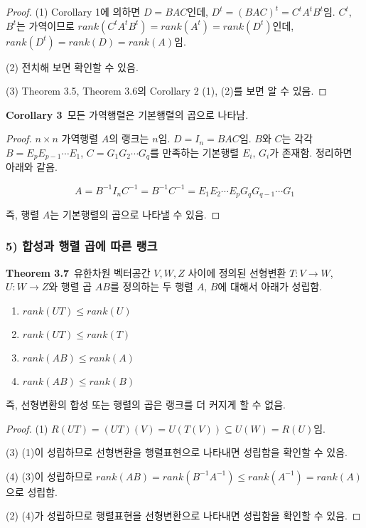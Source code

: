\begin{proof}
(1) Corollary 1에 의하면 $D=BAC$인데, $D^t=(BAC)^t=C^{t}A^{t}B^{t}$임. $C^{t}$, $B^{t}$는 가역이므로 $rank(C^{t}A^{t}B^{t})=rank(A^{t})=rank(D^t)$인데, $rank(D^t)=rank(D)=rank(A)$임.

(2) 전치해 보면 확인할 수 있음.

(3) Theorem 3.5, Theorem 3.6의 Corollary 2 (1), (2)를 보면 알 수 있음.
\end{proof}

\textbf{Corollary 3}\, 모든 가역행렬은 기본행렬의 곱으로 나타남.

\begin{proof}
$n \times n$ 가역행렬 $A$의 랭크는 $n$임. $D=I_n=BAC$임. $B$와 $C$는 각각 $B=E_{p}E_{p-1} \cdots E_{1}$, $C=G_{1}G_{2} \cdots G_{q}$를 만족하는 기본행렬 $E_{i},\,G_{i}$가 존재함. 정리하면 아래와 같음.

\[
A=B^{-1}I_{n}C^{-1}=B^{-1}C^{-1}=E_{1}E_{2} \cdots E_{p}G_{q}G_{q-1} \cdots G_{1}
\]

즉, 행렬 $A$는 기본행렬의 곱으로 나타낼 수 있음.
\end{proof}

\subsubsection*{5) 합성과 행렬 곱에 따른 랭크}
\textbf{Theorem 3.7}\, 유한차원 벡터공간 $V,W,Z$ 사이에 정의된 선형변환 $T:V \rightarrow W$, $U:W \rightarrow Z$와 행렬 곱 $AB$를 정의하는 두 행렬 $A,\,B$에 대해서 아래가 성립함.

\begin{enumerate}
    \item $rank(UT) \leq rank(U)$
    \item $rank(UT) \leq rank(T)$
    \item $rank(AB) \leq rank(A)$
    \item $rank(AB) \leq rank(B)$
\end{enumerate}

즉, 선형변환의 합성 또는 행렬의 곱은 랭크를 더 커지게 할 수 없음.

\begin{proof}
(1) $R(UT)=(UT)(V)=U(T(V)) \subseteq U(W)=R(U)$임.

(3) (1)이 성립하므로 선형변환을 행렬표현으로 나타내면 성립함을 확인할 수 있음.

(4) (3)이 성립하므로 $rank(AB)=rank(B^{-1}A^{-1}) \leq rank(A^{-1})=rank(A)$으로 성립함.

(2) (4)가 성립하므로 행렬표현을 선형변환으로 나타내면 성립함을 확인할 수 있음.

\end{proof}


